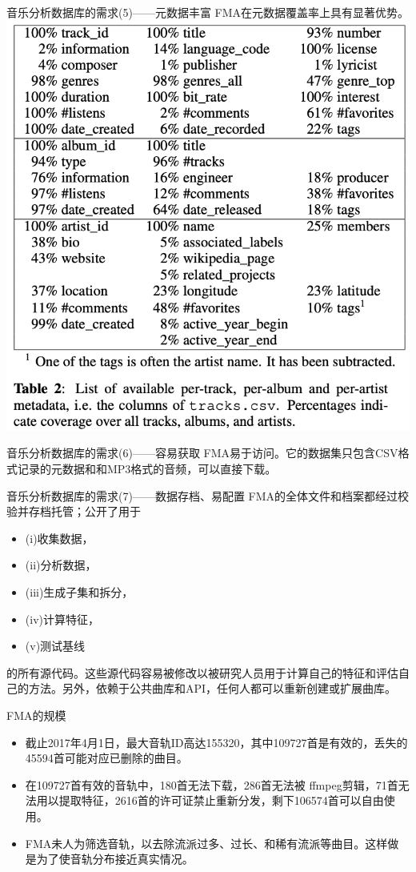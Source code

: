 \documentclass{beamer}
\begin{document}
\begin{frame}{音乐分析数据库的需求(5)——元数据丰富}
	FMA在元数据覆盖率上具有显著优势。
	\includegraphics[width=0.6\linewidth]{Assets/表2}
\end{frame}

\begin{frame}{音乐分析数据库的需求(6)——容易获取}
	FMA易于访问。它的数据集只包含CSV格式记录的元数据和和MP3格式的音频，可以直接下载。
\end{frame}

\begin{frame}{音乐分析数据库的需求(7)——数据存档、易配置}
	FMA的全体文件和档案都经过校验并存档托管；公开了用于
	\begin{itemize}
		\item (i)收集数据，
		\item (ii)分析数据，
		\item (iii)生成子集和拆分，
		\item (iv)计算特征，
		\item (v)测试基线
	\end{itemize}
	的所有源代码。这些源代码容易被修改以被研究人员用于计算自己的特征和评估自己的方法。另外，依赖于公共曲库和API，任何人都可以重新创建或扩展曲库。
\end{frame}

\begin{frame}{FMA的规模}
	\begin{itemize}
		\item 截止2017年4月1日，最大音轨ID高达155320，其中109727首是有效的，丢失的45594首可能对应已删除的曲目。
		\item 在109727首有效的音轨中，180首无法下载，286首无法被 ffmpeg剪辑，71首无法用以提取特征，2616首的许可证禁止重新分发，剩下106574首可以自由使用。
		\item FMA未人为筛选音轨，以去除流派过多、过长、和稀有流派等曲目。这样做是为了使音轨分布接近真实情况。
	\end{itemize}
\end{frame}
\end{document}
